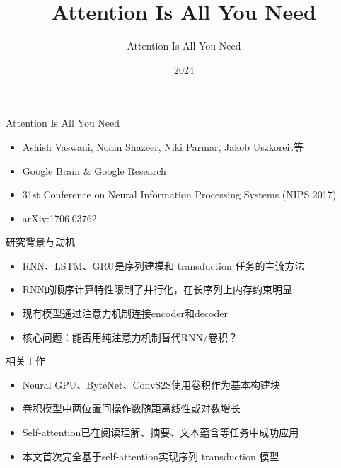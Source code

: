\documentclass[aspectratio=169,12pt]{beamer}
\title{Attention Is All You Need}
\author{Attention Is All You Need}
\date{2024}
\begin{document}
\begin{frame}
\titlepage
\end{frame}


\begin{frame}{Attention Is All You Need}


\begin{itemize}

    \item Ashish Vaswani, Noam Shazeer, Niki Parmar, Jakob Uszkoreit等

    \item Google Brain \& Google Research

    \item 31st Conference on Neural Information Processing Systems (NIPS 2017)

    \item arXiv:1706.03762

\end{itemize}


\end{frame}


\begin{frame}{研究背景与动机}


\begin{itemize}

    \item RNN、LSTM、GRU是序列建模和 transduction 任务的主流方法

    \item RNN的顺序计算特性限制了并行化，在长序列上内存约束明显

    \item 现有模型通过注意力机制连接encoder和decoder

    \item 核心问题：能否用纯注意力机制替代RNN/卷积？

\end{itemize}


\end{frame}


\begin{frame}{相关工作}


\begin{itemize}

    \item Neural GPU、ByteNet、ConvS2S使用卷积作为基本构建块

    \item 卷积模型中两位置间操作数随距离线性或对数增长

    \item Self-attention已在阅读理解、摘要、文本蕴含等任务中成功应用

    \item 本文首次完全基于self-attention实现序列 transduction 模型

\end{itemize}


\end{frame}
\end{document}
